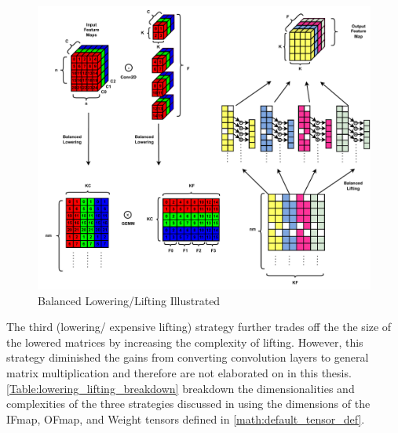 \begin{figure}[!ht]
    \centering
    \includegraphics[scale=0.6]{fig/BalancedLoweringLifting.pdf}
    \caption{Balanced Lowering/Lifting Illustrated}
    \label{fig:balanced_lowering_lifting}
\end{figure}

The third (lowering/ expensive lifting) strategy further trades off the
the size of the lowered matrices by increasing the complexity of lifting.
However, this strategy diminished the gains from converting convolution layers
to general matrix multiplication and therefore are not elaborated on in this
thesis. \autoref{Table:lowering_lifting_breakdown} breakdown the
dimensionalities and complexities of the three strategies discussed in
\cite{cafe_con_troll} using the dimensions of the IFmap, OFmap, and Weight
tensors defined in \autoref{math:default_tensor_def}.     


